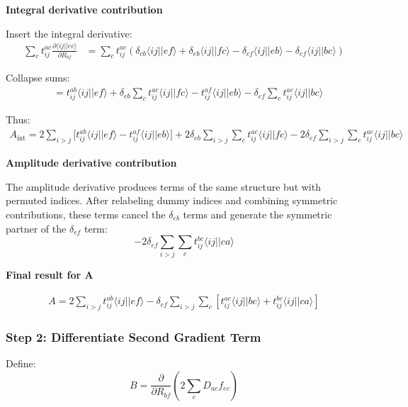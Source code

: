 \textbf{Integral derivative contribution}

Insert the integral derivative:
\begin{align}
\sum_c t_{ij}^{ac}\frac{\partial \langle ij||ec\rangle}{\partial R_{bf}}
&=
\sum_c t_{ij}^{ac}
\left(
\delta_{cb}\langle ij||ef\rangle
+ \delta_{eb}\langle ij||fc\rangle
- \delta_{cf}\langle ij||eb\rangle
- \delta_{ef}\langle ij||bc\rangle
\right)
\end{align}

Collapse sums:
\begin{align}
&= t_{ij}^{ab}\langle ij||ef\rangle
+ \delta_{eb}\sum_c t_{ij}^{ac}\langle ij||fc\rangle
- t_{ij}^{af}\langle ij||eb\rangle
- \delta_{ef}\sum_c t_{ij}^{ac}\langle ij||bc\rangle
\end{align}

Thus:
\begin{align}
A_{\text{int}} =
2\sum_{i>j}
\Big[
t_{ij}^{ab}\langle ij||ef\rangle
- t_{ij}^{af}\langle ij||eb\rangle
\Big]
+ 2\delta_{eb}\sum_{i>j}\sum_c t_{ij}^{ac}\langle ij||fc\rangle
- 2\delta_{ef}\sum_{i>j}\sum_c t_{ij}^{ac}\langle ij||bc\rangle
\end{align}

\textbf{Amplitude derivative contribution}

The amplitude derivative produces terms of the same structure but with permuted indices. After relabeling dummy indices and combining symmetric contributions, these terms cancel the $\delta_{eb}$ terms and generate the symmetric partner of the $\delta_{ef}$ term:
\begin{equation}
- 2\delta_{ef}\sum_{i>j}\sum_c t_{ij}^{bc}\langle ij||ca\rangle
\end{equation}

\textbf{Final result for A}

\begin{align}
A =
2\sum_{i>j} t_{ij}^{ab}\langle ij||ef\rangle
- \delta_{ef}\sum_{i>j}\sum_c
\left[
t_{ij}^{ac}\langle ij||bc\rangle
+
t_{ij}^{bc}\langle ij||ca\rangle
\right]
\end{align}

\subsubsection{Step 2: Differentiate Second Gradient Term}

Define:
\begin{equation}
B = \frac{\partial}{\partial R_{bf}}\left(2\sum_c D_{ac}f_{ec}\right)
\end{equation}

